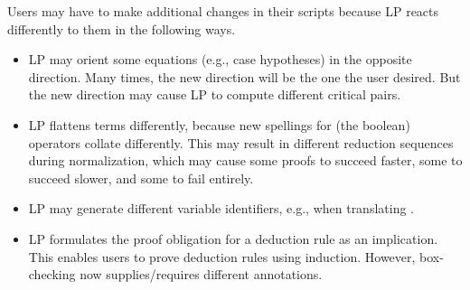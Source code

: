 Users may have to make additional changes in their scripts because LP reacts
differently to them in the following ways.
\begin{itemize}
\item
LP may orient some equations (e.g., case hypotheses) in the opposite direction.
Many times, the new direction will be the one the user desired.  But the new
direction may cause LP to compute different critical pairs.
\item 
LP flattens terms differently, because new spellings for (the boolean)
operators collate differently.  This may result in different reduction
sequences during normalization, which may cause some proofs to succeed faster,
some to succeed slower, and some to fail entirely.
\item
LP may generate different variable identifiers, e.g.,  when translating 
.
\item
LP formulates the proof obligation for a deduction rule as an implication.
This enables users to prove deduction rules using induction.  However,
box-checking now supplies/requires different annotations.
\end{itemize}
